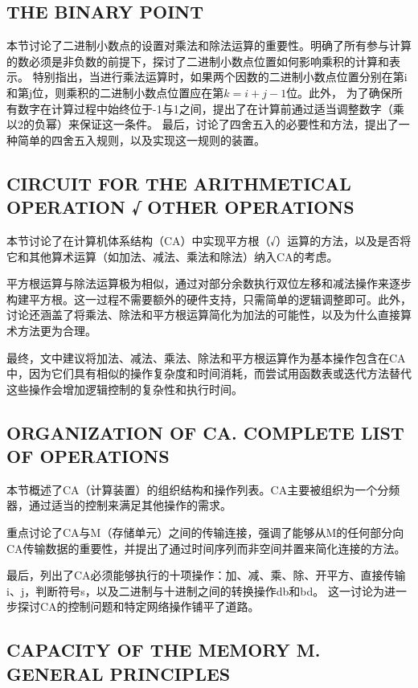 \documentclass[12pt]{article} %
\theoremstyle{definition}
\begin{document}
\subsection{THE BINARY POINT}

本节讨论了二进制小数点的设置对乘法和除法运算的重要性。明确了所有参与计算的数必须是非负数的前提下，探讨了二进制小数点位置如何影响乘积的计算和表示。
特别指出，当进行乘法运算时，如果两个因数的二进制小数点位置分别在第i和第j位，则乘积的二进制小数点位置应在第\(k = i + j - 1\)位。此外，
为了确保所有数字在计算过程中始终位于-1与1之间，提出了在计算前通过适当调整数字（乘以2的负幂）来保证这一条件。
最后，讨论了四舍五入的必要性和方法，提出了一种简单的四舍五入规则，以及实现这一规则的装置。

\subsection{CIRCUIT FOR THE ARITHMETICAL OPERATION √ OTHER OPERATIONS}

本节讨论了在计算机体系结构（CA）中实现平方根（√）运算的方法，以及是否将它和其他算术运算（如加法、减法、乘法和除法）纳入CA的考虑。

平方根运算与除法运算极为相似，通过对部分余数执行双位左移和减法操作来逐步构建平方根。这一过程不需要额外的硬件支持，只需简单的逻辑调整即可。此外，讨论还涵盖了将乘法、除法和平方根运算简化为加法的可能性，以及为什么直接算术方法更为合理。

最终，文中建议将加法、减法、乘法、除法和平方根运算作为基本操作包含在CA中，因为它们具有相似的操作复杂度和时间消耗，而尝试用函数表或迭代方法替代这些操作会增加逻辑控制的复杂性和执行时间。

\subsection{ORGANIZATION OF CA. COMPLETE LIST OF OPERATIONS}

本节概述了CA（计算装置）的组织结构和操作列表。CA主要被组织为一个分频器，通过适当的控制来满足其他操作的需求。

重点讨论了CA与M（存储单元）之间的传输连接，强调了能够从M的任何部分向CA传输数据的重要性，并提出了通过时间序列而非空间并置来简化连接的方法。

最后，列出了CA必须能够执行的十项操作：加、减、乘、除、开平方、直接传输i、j，判断符号s，以及二进制与十进制之间的转换操作db和bd。
这一讨论为进一步探讨CA的控制问题和特定网络操作铺平了道路。

\subsection{CAPACITY OF THE MEMORY M. GENERAL PRINCIPLES}
\end{document}
